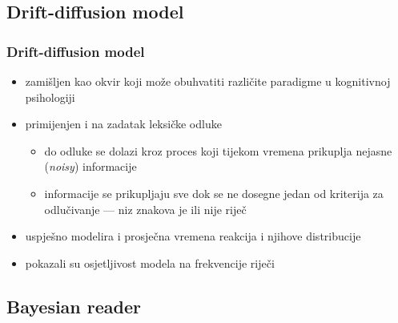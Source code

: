 \documentclass{beamer}
\begin{document}
\subsection{Drift-diffusion model}

\begin{frame}
    \frametitle{Drift-diffusion model \citep{ratcliffTheoryMemoryRetrieval1978}}

    \begin{itemize}
        \item zamišljen kao okvir koji može obuhvatiti različite paradigme u
            kognitivnoj psihologiji

        \pause

        \item primijenjen i na zadatak leksičke odluke
            \begin{itemize}
                \item do odluke se dolazi kroz proces koji tijekom vremena
                    prikuplja nejasne (\textit{noisy}) informacije

                \item informacije se prikupljaju sve dok se ne dosegne jedan od
                    kriterija za odlučivanje --- niz znakova je ili nije riječ
            \end{itemize}

        \pause

        \item uspješno modelira i prosječna vremena reakcija i njihove
            distribucije

        \item \citet{ratcliffDiffusionModelAccount2004} pokazali su osjetljivost
            modela na frekvencije riječi
    \end{itemize}
\end{frame}

\subsection{Bayesian reader}
\end{document}
